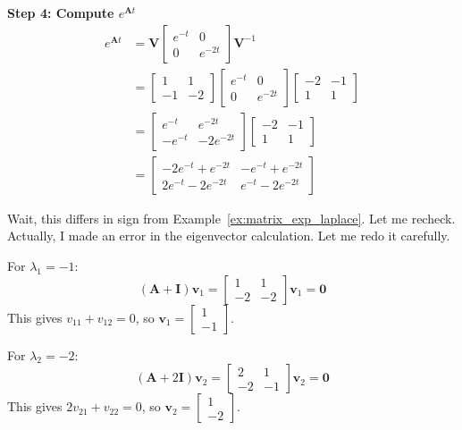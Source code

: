 \begin{example}
\textbf{Step 4: Compute $e^{\mathbf{A}t}$}
\begin{align}
e^{\mathbf{A}t} &= \mathbf{V}\begin{bmatrix} e^{-t} & 0 \\ 0 & e^{-2t} \end{bmatrix}\mathbf{V}^{-1} \\
&= \begin{bmatrix} 1 & 1 \\ -1 & -2 \end{bmatrix}\begin{bmatrix} e^{-t} & 0 \\ 0 & e^{-2t} \end{bmatrix}\begin{bmatrix} -2 & -1 \\ 1 & 1 \end{bmatrix} \\
&= \begin{bmatrix} e^{-t} & e^{-2t} \\ -e^{-t} & -2e^{-2t} \end{bmatrix}\begin{bmatrix} -2 & -1 \\ 1 & 1 \end{bmatrix} \\
&= \begin{bmatrix} -2e^{-t} + e^{-2t} & -e^{-t} + e^{-2t} \\ 2e^{-t} - 2e^{-2t} & e^{-t} - 2e^{-2t} \end{bmatrix}
\end{align}

Wait, this differs in sign from Example~\ref{ex:matrix_exp_laplace}. Let me recheck. Actually, I made an error in the eigenvector calculation. Let me redo it carefully.

For $\lambda_1 = -1$:
\begin{equation}
(\mathbf{A} + \mathbf{I})\mathbf{v}_1 = \begin{bmatrix} 1 & 1 \\ -2 & -2 \end{bmatrix}\mathbf{v}_1 = \mathbf{0}
\end{equation}
This gives $v_{11} + v_{12} = 0$, so $\mathbf{v}_1 = \begin{bmatrix} 1 \\ -1 \end{bmatrix}$.

For $\lambda_2 = -2$:
\begin{equation}
(\mathbf{A} + 2\mathbf{I})\mathbf{v}_2 = \begin{bmatrix} 2 & 1 \\ -2 & -1 \end{bmatrix}\mathbf{v}_2 = \mathbf{0}
\end{equation}
This gives $2v_{21} + v_{22} = 0$, so $\mathbf{v}_2 = \begin{bmatrix} 1 \\ -2 \end{bmatrix}$.


\end{example}
